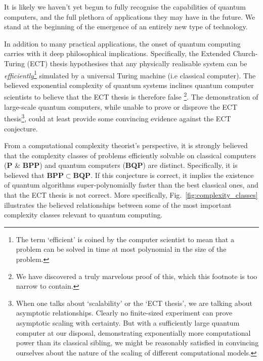 \documentclass[aps, rmp, twocolumn, amsmath, amssymb, nofootinbib, superscriptaddress, longbibliography, floatfix, table-of-contents, eqsecnum]{revtex4-1}
\begin{document}
It is likely we haven't yet begun to fully recognise the capabilities of quantum computers, and the full plethora of applications they may have in the future. We stand at the beginning of the emergence of an entirely new type of technology.

In addition to many practical applications, the onset of quantum computing carries with it deep philosophical implications. Specifically, the Extended Church-Turing (ECT) thesis hypothesises that any physically realisable system can be \textit{efficiently}\footnote{The term `efficient' is coined by the computer scientist to mean that a problem can be solved in time at most polynomial in the size of the problem.} simulated by a universal Turing machine (i.e classical computer). The believed exponential complexity of quantum systems inclines quantum computer scientists to believe that the ECT thesis is therefore false \cite{bib:Deutsch85}\footnote{We have discovered a truly marvelous proof of this, which this footnote is too narrow to contain.}. The demonstration of large-scale quantum computers, while unable to prove or disprove the ECT thesis\footnote{When one talks about `scalability' or the `ECT thesis', we are talking about asymptotic relationships. Clearly no finite-sized experiment can prove asymptotic scaling with certainty. But with a sufficiently large quantum computer at our disposal, demonstrating exponentially more computational power than its classical sibling, we might be reasonably satisfied in convincing ourselves about the nature of the scaling of different computational models.}, could at least provide some convincing evidence against the ECT conjecture.

From a computational complexity theorist's perspective, it is strongly believed that the complexity classes of problems efficiently solvable on classical computers (\textbf{P} \& \textbf{BPP}) and quantum computers (\textbf{BQP}) are distinct. Specifically, it is believed that \mbox{$\mathbf{BPP}\subset\mathbf{BQP}$}. If this conjecture is correct, it implies the existence of quantum algorithms super-polynomially faster than the best classical ones, and that the ECT thesis is not correct. More specifically, Fig.~\ref{fig:complexity_classes} illustrates the believed relationships between some of the most important complexity classes relevant to quantum computing.
\end{document}

